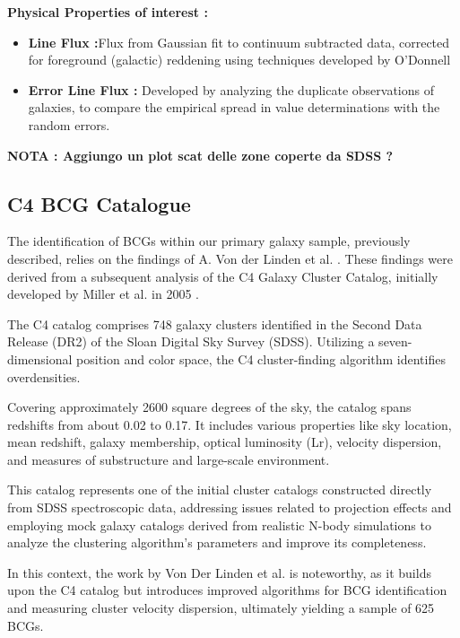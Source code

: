 \textbf{Physical Properties of interest :}
\begin{itemize}
		\item \textbf{Line Flux :}Flux from Gaussian fit to continuum subtracted data, corrected for foreground (galactic) reddening using techniques developed by O'Donnell \cite{1994ApJ...422..158O}
		\item \textbf{Error Line Flux :} Developed by analyzing the duplicate observations of galaxies, to compare the empirical spread in value determinations with the random errors.

\end{itemize}

\textbf{NOTA : Aggiungo un plot scat delle zone coperte da SDSS ?}


\subsection{C4 BCG Catalogue}
The identification of BCGs within our primary galaxy sample, previously described, relies on the findings of A. Von der Linden et al. \cite{2007MNRAS.379..867V, 2009yCat..73790867V}. These findings were derived from a subsequent analysis of the C4 Galaxy Cluster Catalog, initially developed by Miller et al. in 2005 \cite{2005AJ....130..968M}.

The C4 catalog comprises 748 galaxy clusters identified in the Second Data Release (DR2) of the Sloan Digital Sky Survey (SDSS). Utilizing a seven-dimensional position and color space, the C4 cluster-finding algorithm identifies overdensities. 

Covering approximately 2600 square degrees of the sky, the catalog spans redshifts from about 0.02 to 0.17. It includes various properties like sky location, mean redshift, galaxy membership, optical luminosity (Lr), velocity dispersion, and measures of substructure and large-scale environment.

This catalog represents one of the initial cluster catalogs constructed directly from SDSS spectroscopic data, addressing issues related to projection effects and employing mock galaxy catalogs derived from realistic N-body simulations to analyze the clustering algorithm's parameters and improve its completeness.

In this context, the work by Von Der Linden et al.  \cite{2007MNRAS.379..867V} is noteworthy, as it builds upon the C4 catalog but introduces improved algorithms for BCG identification and measuring cluster velocity dispersion,  ultimately yielding a sample of 625 BCGs.

